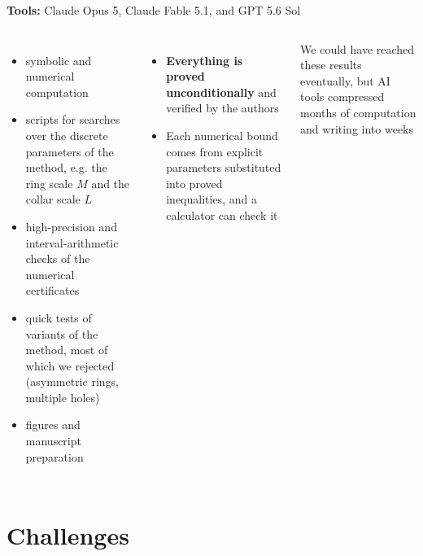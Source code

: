 \textbf{Tools:} Claude Opus 5, Claude Fable 5.1, and GPT 5.6 Sol
\begin{columns}[1 1]
\begin{itemize}
\item symbolic and numerical computation
\item scripts for searches over the discrete parameters of the method, e.g. the ring scale $M$ and the collar scale $L$
\item high-precision and interval-arithmetic checks of the numerical certificates
\item quick tests of variants of the method, most of which we rejected (asymmetric rings, multiple holes)
\item figures and manuscript preparation
\end{itemize}
\columnbreak
{}
\begin{itemize}
\item \textbf{Everything is proved unconditionally} and verified by the authors
\item Each numerical bound comes from explicit parameters substituted into proved inequalities, and a calculator can check it
\end{itemize}
\begin{note}{}
We could have reached these results eventually, but AI tools compressed months of computation and writing into weeks
\end{note}
\end{columns}

\section*{Challenges}

